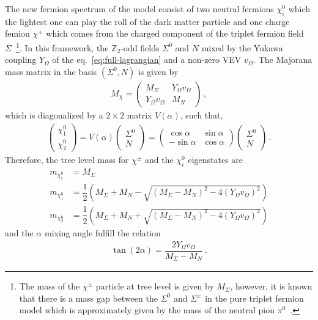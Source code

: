 \documentclass[12pt,letterpaper]{article}
\begin{document}
The new fermion spectrum of the model consist of two neutral fermions $\chi_i^0$ which the lightest one can play the roll of the dark matter particle and one charge femion $\chi^{\pm}$ which comes from the charged component of the triplet fermion field $\Sigma$~\footnote{The mass of the $\chi^{\pm}$ particle at tree level is given by $M_{\Sigma}$, however, it is known that there is a mass gap between the $\Sigma^0$ and $\Sigma^{\pm}$ in the pure triplet fermion model which is approximately given by the mass of the neutral pion $\pi^0$~\cite{Cirelli:2005uq, Choubey:2017yyn}.}. In this framework, the $\mathbb{Z}_2$-odd fields $\Sigma^0$ and $N$ mixed by the Yukawa coupling $Y_{\Omega}$ of the eq.~\ref{eq:full-lagrangian} and a non-zero VEV $v_{\Omega}$. The Majorana mass matrix in the basis $(\Sigma^0, N)$ is given by
%
\begin{align}
\label{eq:M-chi-matrix}
M_{\chi}=
\begin{pmatrix}
M_{\Sigma} & Y_{\Omega}v_{\Omega} \\
Y_{\Omega}v_{\Omega} & M_N
\end{pmatrix}\,,
\end{align}
%
which is diagonalized by a $2\times2$ matrix $V(\alpha)$, such that,
%
\begin{align}
\label{eq:M-chi-rotation}
\begin{pmatrix}
\chi_1^0 \\
\chi_2^0
\end{pmatrix}=
V(\alpha)
\begin{pmatrix}
\Sigma^0 \\
N
\end{pmatrix}
=
\begin{pmatrix}
\cos\alpha & \sin\alpha \\
-\sin\alpha & \cos\alpha
\end{pmatrix}
\begin{pmatrix}
\Sigma^0 \\
N
\end{pmatrix}\,.
\end{align}
%
Therefore, the tree level mass for $\chi^{\pm}$ and the $\chi^0_i$ eigenstates are
%
\begin{align}
m_{\chi_i^0} &= M_\Sigma \nonumber \\
m_{\chi_1^0} &= \dfrac{1}{2}\left(M_\Sigma + M_N - \sqrt{(M_\Sigma - M_N)^2-4(Y_{\Omega}v_{\Omega})^2} \right)\nonumber \\
\label{eq:chi-masses}
m_{\chi_2^0} &= \dfrac{1}{2}\left(M_\Sigma + M_N + \sqrt{(M_\Sigma - M_N)^2-4(Y_{\Omega}v_{\Omega})^2} \right)
\end{align}
and the $\alpha$ mixing angle fulfill the relation
\begin{align}
\label{eq:tan-alpha}
\tan(2\alpha)= \dfrac{2Y_{\Omega}v_\Omega}{M_{\Sigma}-M_N}\,.
\end{align}
\end{document}
